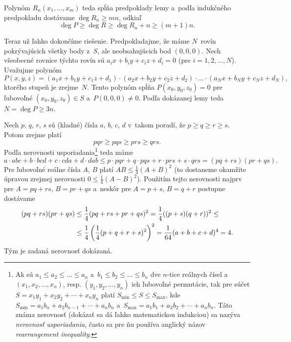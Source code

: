 {Polynóm $R_n(x_1,\dots,x_m)$ teda spĺňa predpoklady lemy a~podľa indukčného predpokladu dostávame $\deg R_n\ge mn$, odkiaľ
$$
\deg P\ge\deg R\ge\deg R_n+n\ge(m+1)n.
$$

\smallskip
Teraz už ľahko dokončíme riešenie. Predpokladajme, že máme $N$~rovín pokrývajúcich všetky body z~$S$, ale neobsahujúcich bod $(0,0,0)$. Nech všeobecné rovnice týchto rovín sú $a_ix+b_iy+c_iz+d_i=0$ (pre $i=1,2,\dots,N$). Uvažujme polynóm
$$
P(x,y,z)=(a_1x+b_1y+c_1z+d_1)\cdot(a_2x+b_2y+c_2z+d_2)\cdot\dots\cdot(a_Nx+b_Ny+c_Nz+d_N),
$$
ktorého stupeň je zrejme~$N$. Tento polynóm spĺňa $P(x_0,y_0,z_0)=0$ pre ľubovoľné $(x_0,y_0,z_0)\in S$ a~$P(0,0,0)\ne0$. Podľa dokázanej lemy teda $N=\deg P\ge 3n$.
}

{%
Nech $p$, $q$, $r$, $s$ sú (kladné) čísla $a$, $b$, $c$, $d$ v~takom poradí, že $p\ge q\ge r\ge s$. Potom zrejme platí 
$$
pqr\ge pqs\ge prs\ge qrs.
$$
Podľa nerovnosti usporiadania\footnote{Ak sú $a_1\le a_2\le\dots\le a_n$ a~$b_1\le b_2\le\dots\le b_n$ dve $n$-tice reálnych čísel
a~$(x_1,x_2,\dots,x_n)$, resp. $(y_1,y_2,\dots,y_n)$ ich ľubovoľné permutácie, tak pre súčet $S=x_1y_1+x_2y_2+\cdots+x_ny_n$ platí $S_{\min}\le S\le S_{\max}$, kde $S_{\min}=a_1b_n+a_2b_{n-1}+\cdots+a_nb_n$
a~$S_{\max}=a_1b_1+a_2b_2+\cdots+a_nb_n$. Táto známa nerovnosť (dokázať sa dá ľahko matematickou indukciou) sa nazýva {\it nerovnosť usporiadania}, často sa pre ňu používa anglický názov {\it rearrangement inequality}.} teda máme
$$
a\cdot abc+b\cdot bcd+c\cdot cda+d\cdot dab\le p\cdot pqr+q\cdot pqs+r\cdot prs+s\cdot qrs=(pq+rs)(pr+qs).
$$
Pre ľubovoľné reálne čísla $A$, $B$ platí $AB\le\frac14(A+B)^2$ (to dostaneme okamžite úpravou zrejmej nerovnosti $0\le\frac14(A-B)^2$). Použitím tejto nerovnosti najprv pre $A=pq+rs$, $B=pr+qs$ a~neskôr pre $A=p+s$, $B=q+r$ postupne dostávame
$$
\aligned
(pq+rs)(pr+qs)&\le\frac14(pq+rs+pr+qs)^2=\frac14((p+s)(q+r))^2\le\\
&\le\frac14\left(\frac14(p+q+r+s)^2\right)^2=\frac1{64}(a+b+c+d)^4=4.
\endaligned
$$
Tým je zadaná nerovnosť dokázaná.
}

